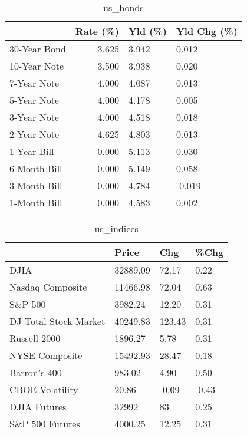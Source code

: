 \documentclass{article}%
\begin{document}
%


\begin{table}[htbp]%
\caption{us\_bonds}%
\centering%
\begin{adjustbox}{width=1\textwidth}%
\begin{tabular}{lrll}
\toprule
             &  Rate (\%) & Yld (\%) & Yld Chg (\%) \\
\midrule
30-Year Bond &     3.625 &   3.942 &       0.012 \\
10-Year Note &     3.500 &   3.938 &       0.020 \\
 7-Year Note &     4.000 &   4.087 &       0.013 \\
 5-Year Note &     4.000 &   4.178 &       0.005 \\
 3-Year Note &     4.000 &   4.518 &       0.018 \\
 2-Year Note &     4.625 &   4.803 &       0.013 \\
 1-Year Bill &     0.000 &   5.113 &       0.030 \\
6-Month Bill &     0.000 &   5.149 &       0.058 \\
3-Month Bill &     0.000 &   4.784 &      -0.019 \\
1-Month Bill &     0.000 &   4.583 &       0.002 \\
\bottomrule
\end{tabular}
%
\end{adjustbox}%
\end{table}

%


\begin{table}[htbp]%
\caption{us\_indices}%
\centering%
\begin{adjustbox}{width=1\textwidth}%
\begin{tabular}{llll}
\toprule
                      &    Price &    Chg &  \%Chg \\
\midrule
                 DJIA & 32889.09 &  72.17 &  0.22 \\
     Nasdaq Composite & 11466.98 &  72.04 &  0.63 \\
              S\&P 500 &  3982.24 &  12.20 &  0.31 \\
DJ Total Stock Market & 40249.83 & 123.43 &  0.31 \\
         Russell 2000 &  1896.27 &   5.78 &  0.31 \\
       NYSE Composite & 15492.93 &  28.47 &  0.18 \\
         Barron's 400 &   983.02 &   4.90 &  0.50 \\
      CBOE Volatility &    20.86 &  -0.09 & -0.43 \\
         DJIA Futures &    32992 &     83 &  0.25 \\
      S\&P 500 Futures &  4000.25 &  12.25 &  0.31 \\
\bottomrule
\end{tabular}
%
\end{adjustbox}%
\end{table}
\end{document}
